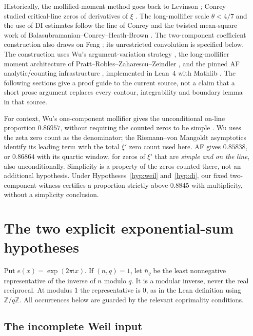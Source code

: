 \documentclass[11pt]{article}
\theoremstyle{definition}
\newcommand{\ii}{\mathrm i}
\begin{document}
Historically, the mollified-moment method goes back to Levinson
\cite{Levinson}; Conrey studied critical-line zeros of derivatives of
$\xi$ \cite{ConreyXi}. The long-mollifier scale $\theta<4/7$ and the
use of DI estimates follow the line of Conrey \cite{ConreyLong} and the
twisted mean-square work of Balasubramanian--Conrey--Heath-Brown
\cite{BCHB}. The two-component coefficient construction also draws on
Feng \cite{Feng}; its unrestricted convolution is specified below.
The construction uses Wu's argument-variation strategy \cite{Wu},
the long-mollifier moment architecture of
Pratt--Robles--Zaharescu--Zeindler \cite{PRZZ}, and the pinned AF
analytic/counting infrastructure \cite{AF,Repo}, implemented in Lean~4
\cite{Lean4} with Mathlib \cite{Mathlib}. The following sections
give a proof guide to the current source, not a claim that a short prose
argument replaces every contour, integrability and boundary lemma in
that source.

For context, Wu's one-component mollifier gives the unconditional
on-line proportion $0.86957$, without requiring the counted zeros to
be simple \cite[Section~3]{Wu}. Wu uses the zeta zero count as the
denominator; the Riemann--von Mangoldt asymptotics identify its leading
term with the total $\xi'$ zero count used here.
AF \cite[Remark~7.1 in the cited version]{AF} gives $0.85838$, or
$0.86864$ with its quartic window, for zeros of $\xi'$ that are
\emph{simple and on the line}, also unconditionally. Simplicity is a
property of the zeros counted there, not an additional hypothesis.
Under Hypotheses~\ref{hyp:weil} and~\ref{hyp:di}, our fixed two-component
witness certifies a proportion strictly above $0.8845$ with multiplicity,
without a simplicity conclusion.

\section{The two explicit exponential-sum hypotheses}\label{sec:inputs}

Put $e(x)=\exp(2\pi\ii x)$. If $(n,q)=1$, let $\bar n_q$ be the least
nonnegative representative of the inverse of $n$ modulo $q$.
It is a modular inverse, never the real reciprocal. At modulus $1$
the representative is $0$, as in the Lean definition using
$\mathbb Z/q\mathbb Z$. All occurrences below are guarded by the relevant
coprimality conditions.

\subsection{The incomplete Weil input}
\end{document}
